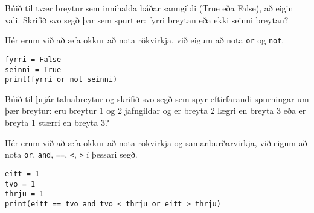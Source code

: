 \begin{exercise}\label{exp2}
Búið til tvær breytur sem innihalda báðar sanngildi (True eða False), að eigin vali.
Skrifið svo segð þar sem spurt er: fyrri breytan eða ekki seinni breytan?
\end{exercise}
\begin{Answer}[ref={exp2}]
Hér erum við að æfa okkur að nota rökvirkja, við eigum að nota \texttt{or} og \texttt{not}.
	\begin{lstlisting}
fyrri = False
seinni = True
print(fyrri or not seinni)\end{lstlisting}
\end{Answer}

\begin{exercise}\label{exp3}
Búið til þrjár talnabreytur og skrifið svo segð sem spyr eftirfarandi spurningar um þær breytur: eru breytur 1 og 2 jafngildar og er breyta 2 lægri en breyta 3 eða er breyta 1 stærri en breyta 3?
\end{exercise}
\begin{Answer}[ref={exp3}]
	Hér erum við að æfa okkur að nota rökvirkja og samanburðarvirkja, við eigum að nota \texttt{or}, \texttt{and}, \texttt{==}, \texttt{<}, \texttt{>} í þessari segð.
	\begin{lstlisting}
eitt = 1
tvo = 1
thrju = 1
print(eitt == tvo and tvo < thrju or eitt > thrju)\end{lstlisting}
\end{Answer}

